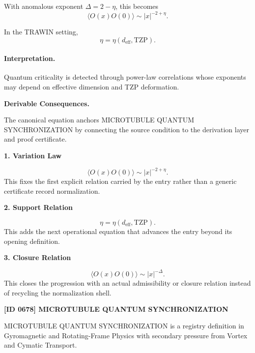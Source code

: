 With anomalous exponent $\Delta=2-\eta$, this becomes
\begin{equation}
\boxed{
\langle O(x)O(0)\rangle
\sim
|x|^{-2+\eta}.
}
\end{equation}

In the TRAWIN setting,
\begin{equation}
\eta=\eta(d_{\mathrm{eff}},\mathrm{TZP}).
\end{equation}

\paragraph{Interpretation.}
Quantum criticality is detected through power-law correlations whose exponents may depend on effective dimension and TZP deformation.

\par\vspace{0.35em}
\noindent\textbf{Derivable Consequences.}\quad
\begingroup
\footnotesize
\raggedright
The canonical equation anchors MICROTUBULE QUANTUM SYNCHRONIZATION by connecting the source condition to the derivation layer and proof certificate.
\par\endgroup

\noindent\textbf{1. Variation Law}\par
\[
\langle O(x)O(0)\rangle \sim |x|^{-2+\eta}.
\]
\noindent This fixes the first explicit relation carried by the entry rather than a generic certificate record normalization.\par
\noindent\textbf{2. Support Relation}\par
\[
\eta=\eta(d_{\mathrm{eff}},\mathrm{TZP}).
\]
\noindent This adds the next operational equation that advances the entry beyond its opening definition.\par
\noindent\textbf{3. Closure Relation}\par
\[
\langle O(x)O(0)\rangle \sim |x|^{-\Delta}.
\]
\noindent This closes the progression with an actual admissibility or closure relation instead of recycling the normalization shell.\par

\clearpage
\noindent\textbf{[ID 0678] MICROTUBULE QUANTUM SYNCHRONIZATION}\par
\vspace{0.35em}
\begingroup\small
{}
MICROTUBULE QUANTUM SYNCHRONIZATION is a registry definition in Gyromagnetic and Rotating-Frame Physics with secondary pressure from Vortex and Cymatic Transport.

